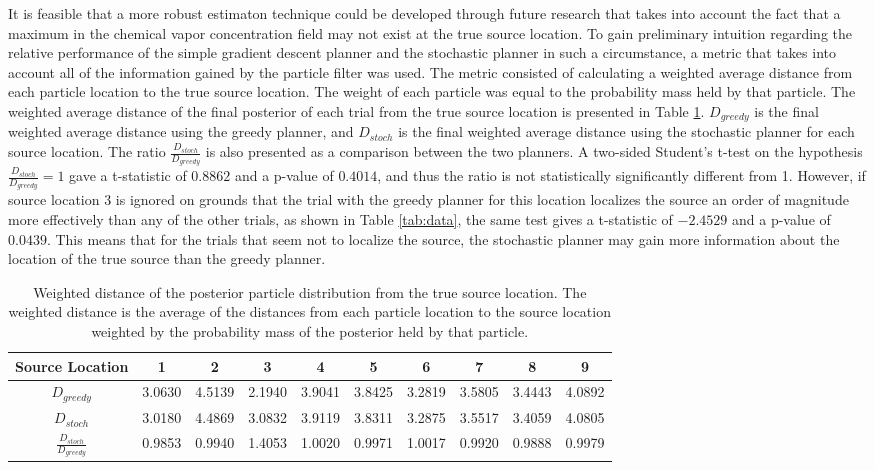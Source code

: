 \documentclass[submit, 12pt]{aiaa-pretty-modified}
\begin{document}
It is feasible that a more robust estimaton technique could be developed through
future research that takes into account the fact that a maximum in the
chemical vapor concentration field may not exist at the true source
location.  To gain preliminary intuition regarding the relative performance of the simple gradient descent planner and the
stochastic planner in such a circumstance, a metric that takes into
account all of the information gained by the particle filter was used.  The metric consisted of calculating a
weighted average distance from each particle location to the true
source location.  The weight of each particle was equal to the
probability mass held by that particle.  The weighted average distance
of the final posterior of each trial from the true source location is
presented in Table \ref{tab:weighted-distance}.  $D_{greedy}$ is the final
weighted average distance using the greedy planner, and
$D_{stoch}$ is the final weighted average distance using the
stochastic planner for each source location.  The ratio
$\frac{D_{stoch}}{D_{greedy}}$ is also presented as a comparison
between the two planners.  A two-sided Student's t-test on the
hypothesis $\frac{D_{stoch}}{D_{greedy}} = 1$ gave a t-statistic of
$0.8862$ and a p-value of $0.4014$, and thus the ratio is not
statistically significantly different from 1.  However, if source
location 3 is ignored on grounds that the trial with the greedy
planner for this location localizes the source an order of magnitude
more effectively than any of the other trials, as shown in
Table \ref{tab:data}, the same test
gives a t-statistic of $-2.4529$ and a p-value
of $0.0439$.  This means that for the trials that seem not to
localize the source, the stochastic planner may gain more information
about the location of the true source than the greedy planner.

\begin{table}[htb]
\begin{center}
\begin{tabular}{|c||c||c||c||c||c||c||c||c||c|}
\hline
 Source Location & 1 & 2 & 3 & 4 & 5 & 6 & 7 & 8 & 9 \\
\hline \hline
$D_{greedy}$ & 3.0630 & 4.5139 & 2.1940 & 3.9041 & 3.8425 & 3.2819 & 3.5805 & 3.4443 & 4.0892 \\
\hline
$D_{stoch}$ & 3.0180 & 4.4869 & 3.0832 & 3.9119 & 3.8311 & 3.2875 & 3.5517 & 3.4059 & 4.0805 \\
\hline
$\frac{D_{stoch}}{D_{greedy}}$ & 0.9853 & 0.9940 & 1.4053 & 1.0020 & 0.9971 & 1.0017 & 0.9920 & 0.9888 & 0.9979 \\
\hline
\end{tabular}
\caption[Probabilistically weighted distance from the posterior estimate to the
source location]{Weighted distance of the posterior particle distribution from the true
  source location. The weighted distance is the average of the distances from
  each particle location to the source location weighted by the probability
  mass of the posterior held by that particle.}
\label{tab:weighted-distance}
\end{center}
\end{table}
\end{document}
